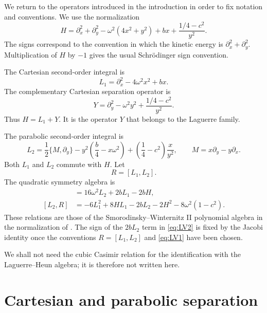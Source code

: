 \documentclass[11pt]{article}
\numberwithin{equation}{section}
\theoremstyle{definition}
\theoremstyle{remark}
\newcommand{\ac}[2]{\{#1,#2\}}
\begin{document}
We return to the operators introduced in the introduction in order to fix
notation and conventions.  We use the normalization
\begin{equation}
  H=\partial_x^2+\partial_y^2
    -\omega^2(4x^2+y^2)+bx+\frac{1/4-c^2}{y^2}.
  \label{eq:H}
\end{equation}
The signs correspond to the convention in which the kinetic energy is
\(\partial_x^2+\partial_y^2\).  Multiplication of \(H\) by \(-1\) gives the
usual Schrödinger sign convention.

The Cartesian second-order integral is
\begin{equation}
  L_1=\partial_x^2-4\omega^2x^2+bx.
  \label{eq:L1}
\end{equation}
The complementary Cartesian separation operator is
\begin{equation}
  Y=
  \partial_y^2-\omega^2y^2+\frac{1/4-c^2}{y^2}.
  \label{eq:Y}
\end{equation}
Thus \(H=L_1+Y\).  It is the operator $Y$ that belongs to the Laguerre family.

The parabolic second-order integral is
\begin{equation}
  L_2=\frac12\ac{M}{\partial_y}
      -y^2\left(\frac b4-x\omega^2\right)
      +\left(\frac14-c^2\right)\frac{x}{y^2},
  \qquad
  M=x\partial_y-y\partial_x .
  \label{eq:L2}
\end{equation}
Both \(L_1\) and \(L_2\) commute with \(H\).  Let
\begin{equation}
  R=[L_1,L_2].
\end{equation}
The quadratic symmetry algebra is
\begin{align}
 [L_1,R]&=16\omega^2L_2+2bL_1-2bH,                         \label{eq:LV1}\\
 [L_2,R]&=-6L_1^2+8HL_1-2bL_2-2H^2-8\omega^2(1-c^2).
                                                                    \label{eq:LV2}
\end{align}
These relations are those of the Smorodinsky--Winternitz II polynomial
algebra in the normalization of \cite{LetourneauVinet1995}.  The sign of
the \(2bL_2\) term in \eqref{eq:LV2} is fixed by the Jacobi identity once
the conventions \(R=[L_1,L_2]\) and \eqref{eq:LV1} have been chosen.

We shall not need the cubic Casimir relation for the identification with the
Laguerre--Heun algebra; it is therefore not written here.

\section{Cartesian and parabolic separation}
\end{document}
